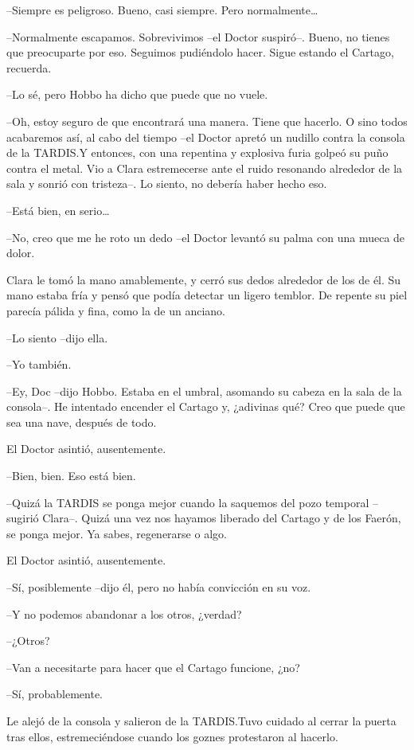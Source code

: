 {--Siempre es peligroso. Bueno, casi siempre. Pero normalmente\ldots{}}

{--Normalmente escapamos. Sobrevivimos --el Doctor suspiró--. Bueno, no
 tienes que preocuparte por eso. Seguimos pudiéndolo hacer. Sigue estando
el Cartago, recuerda.}

{--Lo sé, pero Hobbo ha dicho que puede que no vuele.}

{--Oh, estoy seguro de que encontrará una manera. Tiene que hacerlo. O
 sino todos acabaremos así, al cabo del tiempo --el Doctor apretó un
 nudillo contra la consola de la TARDIS.\@ Y entonces, con una repentina y
 explosiva furia golpeó su puño contra el metal. Vio a Clara estremecerse
 ante el ruido resonando alrededor de la sala y sonrió con tristeza--. Lo
siento, no debería haber hecho eso.}

{--Está bien, en serio\ldots{}}

{--No, creo que me he roto un dedo --el Doctor levantó su palma con una
mueca de dolor.}

{Clara le tomó la mano amablemente, y cerró sus dedos alrededor de los de
 él. Su mano estaba fría y pensó que podía detectar un ligero temblor. De
repente su piel parecía pálida y fina, como la de un anciano.}

{--Lo siento --dijo ella.}

{--Yo también.}

{--Ey, Doc --dijo Hobbo. Estaba en el umbral, asomando su cabeza en la
 sala de la consola--. He intentado encender el Cartago y, ¿adivinas qué?
Creo que puede que sea una nave, después de todo.}

{El Doctor asintió, ausentemente.}

{--Bien, bien. Eso está bien.}

{--Quizá la TARDIS se ponga mejor cuando la saquemos del pozo temporal
 --sugirió Clara--. Quizá una vez nos hayamos liberado del Cartago y de
los Faerón, se ponga mejor. Ya sabes, regenerarse o algo.}

{El Doctor asintió, ausentemente.}

{--Sí, posiblemente --dijo él, pero no había convicción en su voz.}

{--Y no podemos abandonar a los otros, ¿verdad?}

{--¿Otros?}

{--Van a necesitarte para hacer que el Cartago funcione, ¿no?}

{--Sí, probablemente.}

{Le alejó de la consola y salieron de la TARDIS.\@ Tuvo cuidado al cerrar
 la puerta tras ellos, estremeciéndose cuando los goznes protestaron al
 hacerlo.}

